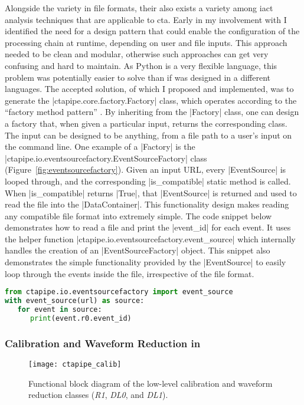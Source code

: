 Alongside the variety in file formats, their also exists a variety among \gls{iact} analysis techniques that are applicable to \gls{cta}. Early in my involvement with  I identified the need for a design pattern that could enable the configuration of the processing chain at runtime, depending on user and file inputs. This approach needed to be clean and modular, otherwise such approaches can get very confusing and hard to maintain. As Python is a very flexible language, this problem was potentially easier to solve than if  was designed in a different languages. The accepted solution, of which I proposed and implemented, was to generate the |ctapipe.core.factory.Factory| class, which operates according to the ``factory method pattern'' \cite{johnson2005design}. By inheriting from the |Factory| class, one can design a factory that, when given a particular input, returns the corresponding class. The input can be designed to be anything, from a file path to a user's input on the command line. One example of a |Factory| is the |ctapipe.io.eventsourcefactory.EventSourceFactory| class (Figure~\ref{fig:eventsourcefactory}). Given an input URL, every |EventSource| is looped through, and the corresponding |is_compatible| static method is called. When |is_compatible| returns |True|, that |EventSource| is returned and used to read the file into the |DataContainer|. This functionality design makes reading any compatible file format into  extremely simple. The code snippet below demonstrates how to read a file and print the |event_id| for each event. It uses the helper function |ctapipe.io.eventsourcefactory.event_source| which internally handles the creation of an |EventSourceFactory| object. This snippet also demonstrates the simple functionality provided by the |EventSource| to easily loop through the events inside the file, irrespective of the file format.

\begin{lstlisting}[language=Python]
from ctapipe.io.eventsourcefactory import event_source
with event_source(url) as source:
   for event in source:
      print(event.r0.event_id)
\end{lstlisting}

\subsubsection{Calibration and Waveform Reduction in }

\begin{figure}[t]
  \centering
  \texttt{[image: ctapipe\_calib]}
  \caption[Functional block diagram of the  low-level calibration classes.]{Functional block diagram of the  low-level calibration and waveform reduction classes (\textit{R1}, \textit{DL0}, and \textit{DL1}).}
  \label{fig:ctapipe_calib}
\end{figure}

